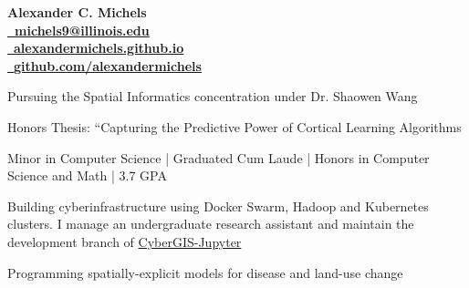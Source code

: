 \documentclass{acmresume}
\begin{document}
	
	\begin{multicols}{2}
		\vspace*{.15cm}
		\textbf{\Huge Alexander C. Michels} \\
		\columnbreak
        \hfill\href{mailto:alexandercm4297@gmail.com}{\textbf{\faEnvelope~michels9@illinois.edu}} \\
		\hfill\href{http://alexandermichels.github.io}{\faGlobeAmericas~\textbf{alexandermichels.github.io}} \\
		\hfill\href{https://github.com/alexandermichels}{\faGithub~\textbf{github.com/alexandermichels}}
	\end{multicols}
	
	
		\begin{titemize}
			\item{Pursuing the Spatial Informatics concentration under Dr. Shaowen Wang}
		\end{titemize}

		\begin{titemize}
            \item Honors Thesis: ``Capturing the Predictive Power of Cortical Learning Algorithms
			\item{Minor in Computer Science | Graduated Cum Laude | Honors in Computer Science and Math | 3.7 GPA}
		\end{titemize}
	
	
        \begin{titemize}
            \item Building cyberinfrastructure using Docker Swarm, Hadoop and Kubernetes clusters. I manage an undergraduate research assistant and maintain the development branch of \hyperlink{https://cybergis.illinois.edu/project/cybergis-jupyter/}{CyberGIS-Jupyter}
            \item Programming spatially-explicit models for disease and land-use change
        \end{titemize}
	
\end{document}
